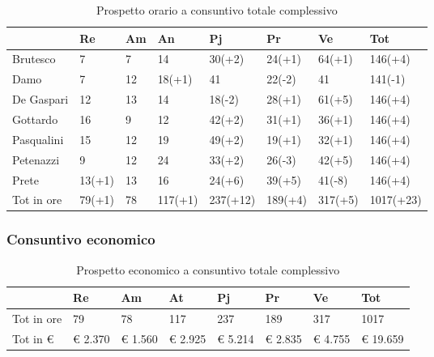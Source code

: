 						\begin{table}[h] \begin{center} \begin{tabular}{llllllll}																					
						\toprule		
							&	Re		&	Am		&	An		&	Pj		&	Pr		&	Ve		&	Tot	\\
							\midrule								
							Brutesco	&	7		&	7		&	14		&	30(+2)		&	24(+1)		&	64(+1)	&	146(+4)	\\
							Damo		&	7		&	12		&	18(+1)	&	41			&	22(-2)		&	41		&	141(-1)	\\
							De Gaspari	&	12		&	13		&	14		&	18(-2)			&	28(+1)		&	61(+5)	&	146(+4)	\\
							Gottardo	&	16		&	9		&	12		&	42(+2)		&	31(+1)		&	36(+1)	&	146(+4)	\\
							Pasqualini	&	15		&	12		&	19		&	49(+2)		&	19(+1)		&	32(+1)	&	146(+4)	\\
							Petenazzi	&	9		&	12		&	24		&	33(+2)		&	26(-3)		&	42(+5)	&	146(+4)	\\
							Prete		&	13(+1)	&	13		&	16		&	24(+6)		&	39(+5)		&	41(-8)	&	146(+4)	\\
							\midrule																					
							Tot in ore	&	79(+1)		&	78		&	117(+1)		&	237(+12)		&	189(+4)		&	317(+5)		&	1017(+23)	\\

					
						\bottomrule																					
						\end{tabular} \end{center} \caption{Prospetto orario a consuntivo totale complessivo							
						} \end{table}
		\subsubsection{Consuntivo economico}
						\begin{table}[H] \begin{center} \begin{tabular}{llllllll}
						\toprule
							&	\textbf{Re}	&	\textbf{Am}	&	\textbf{At}	&	\textbf{Pj}	&	\textbf{Pr}	&	\textbf{Ve}	&	\textbf{Tot}\\
						\midrule																					
							Tot in ore	&	79		&	78		&	117		&	237		&	189		&	317		&	1017	\\
							Tot in €	&	 € 2.370 		 & 	 € 1.560 		 & 	 € 2.925 		 & 	 € 5.214 		 & 	 € 2.835 		 & 	 € 4.755 		 & 	 € 19.659 	\\




						\bottomrule			
						\end{tabular} \end{center} \caption{Prospetto economico a consuntivo totale complessivo
						} \end{table}
					
